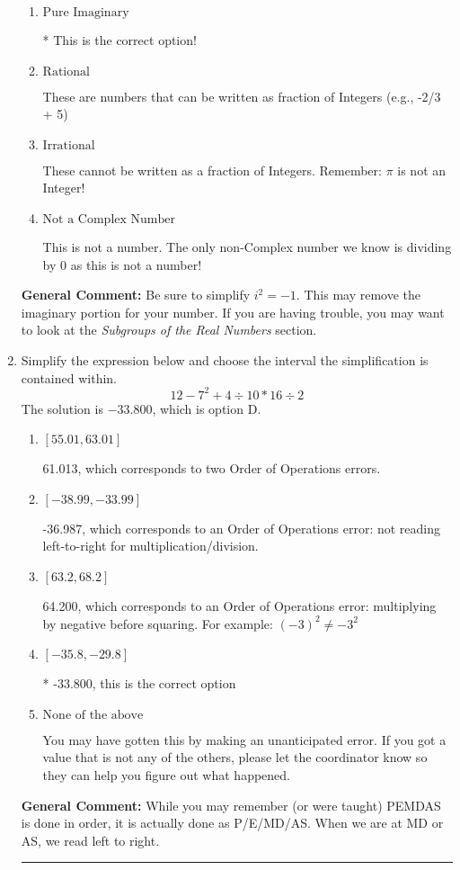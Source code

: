 \documentclass{extbook}[14pt]
\newcommand{\litem}[1]{\item #1

\rule{\textwidth}{0.4pt}}
\begin{document}
\begin{enumerate}
{\begin{enumerate}[label=\Alph*.]
This is a Complex number $(a+bi)$ that is not Real (has $i$ as part of the number).
\item \( \text{Pure Imaginary} \)

* This is the correct option!
\item \( \text{Rational} \)

These are numbers that can be written as fraction of Integers (e.g., -2/3 + 5)
\item \( \text{Irrational} \)

These cannot be written as a fraction of Integers. Remember: $\pi$ is not an Integer!
\item \( \text{Not a Complex Number} \)

This is not a number. The only non-Complex number we know is dividing by 0 as this is not a number!
\end{enumerate}

\textbf{General Comment:} Be sure to simplify $i^2 = -1$. This may remove the imaginary portion for your number. If you are having trouble, you may want to look at the \textit{Subgroups of the Real Numbers} section.
}
\litem{
Simplify the expression below and choose the interval the simplification is contained within.
\[ 12 - 7^2 + 4 \div 10 * 16 \div 2 \]The solution is \( -33.800 \), which is option D.\begin{enumerate}[label=\Alph*.]
\item \( [55.01, 63.01] \)

 61.013, which corresponds to two Order of Operations errors.
\item \( [-38.99, -33.99] \)

 -36.987, which corresponds to an Order of Operations error: not reading left-to-right for multiplication/division.
\item \( [63.2, 68.2] \)

 64.200, which corresponds to an Order of Operations error: multiplying by negative before squaring. For example: $(-3)^2 \neq -3^2$
\item \( [-35.8, -29.8] \)

* -33.800, this is the correct option
\item \( \text{None of the above} \)

 You may have gotten this by making an unanticipated error. If you got a value that is not any of the others, please let the coordinator know so they can help you figure out what happened.
\end{enumerate}

\textbf{General Comment:} While you may remember (or were taught) PEMDAS is done in order, it is actually done as P/E/MD/AS. When we are at MD or AS, we read left to right.
}
\end{enumerate}
\end{document}
